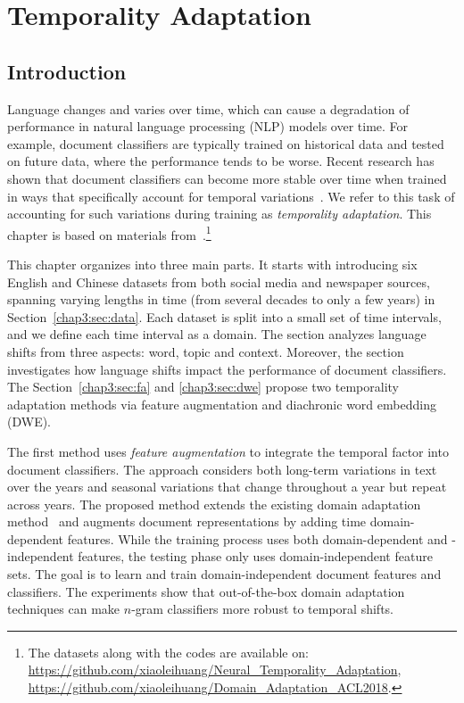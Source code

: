 \chapter{Temporality Adaptation}
\label{chp:temporality}

\section{Introduction}
Language changes and varies over time,
which can cause a degradation of performance in
natural language processing (NLP) models over time.
For example, document classifiers are typically trained on historical data and tested on future data, where the performance tends to be worse.
Recent research has shown that document classifiers can become more stable over time when trained in ways that specifically account for temporal variations~\cite{he2018time}.
We refer to this task of accounting for such variations during training as {\em temporality adaptation}.
This chapter is based on materials from~\cite{huang2018examining, huang2019neural}.\footnote{The datasets along with the codes are available on: \\\url{https://github.com/xiaoleihuang/Neural_Temporality_Adaptation}, \\\url{https://github.com/xiaoleihuang/Domain_Adaptation_ACL2018}.}

This chapter organizes into three main parts.
It starts with introducing six English and Chinese datasets from both social media and newspaper sources, spanning varying lengths in time (from several decades to only a few years) in Section~\ref{chap3:sec:data}. 
Each dataset is split into a small set of time intervals, and we define each time interval as a domain. 
The section analyzes language shifts from three aspects: word, topic and context. 
Moreover, the section investigates how language shifts impact the performance of document classifiers.
The Section~\ref{chap3:sec:fa} and \ref{chap3:sec:dwe} propose two temporality adaptation methods via feature augmentation and diachronic word embedding (DWE).

The first method uses \textit{feature augmentation} to integrate the temporal factor into document classifiers.
The approach considers both long-term variations in text over the years and seasonal variations that change throughout a year but repeat across years.
The proposed method extends the existing domain adaptation method~\cite{daume2007frustratingly} and augments document representations by adding time domain-dependent features.
While the training process uses both domain-dependent and -independent features, the testing phase only uses domain-independent feature sets.
The goal is to learn and train domain-independent document features and classifiers.
The experiments show that out-of-the-box domain adaptation techniques can make $n$-gram classifiers more robust to temporal shifts.

